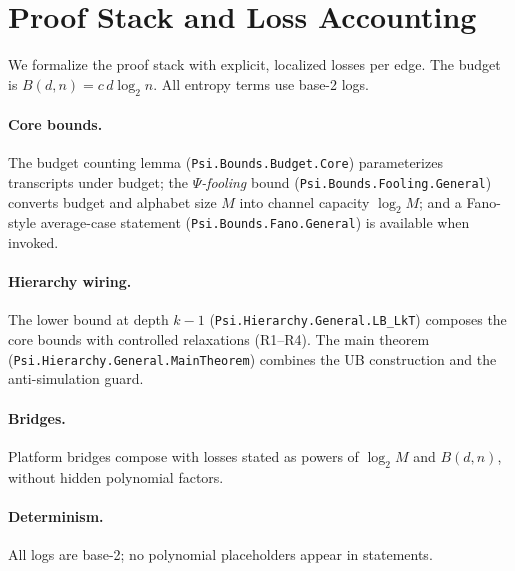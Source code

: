 \section{Proof Stack and Loss Accounting}
We formalize the proof stack with explicit, localized losses per edge. The budget is \(B(d,n)=c\,d\log_{2} n\). All entropy terms use base-2 logs.

\paragraph{Core bounds.} The budget counting lemma (\texttt{\textup{Psi.Bounds.Budget.Core}}) parameterizes transcripts under budget; the \emph{$\Psi$-fooling} bound (\texttt{\textup{Psi.Bounds.Fooling.General}}) converts budget and alphabet size \(M\) into channel capacity \(\log_{2} M\); and a Fano-style average-case statement (\texttt{\textup{Psi.Bounds.Fano.General}}) is available when invoked.

\paragraph{Hierarchy wiring.} The lower bound at depth \(k-1\) (\texttt{\textup{Psi.Hierarchy.General.LB\_LkT}}) composes the core bounds with controlled relaxations (R1--R4). The main theorem (\texttt{\textup{Psi.Hierarchy.General.MainTheorem}}) combines the UB construction and the anti-simulation guard.

\paragraph{Bridges.} Platform bridges compose with losses stated as powers of \(\log_{2} M\) and \(B(d,n)\), without hidden polynomial factors.

\paragraph{Determinism.} All logs are base-2; no polynomial placeholders appear in statements.

